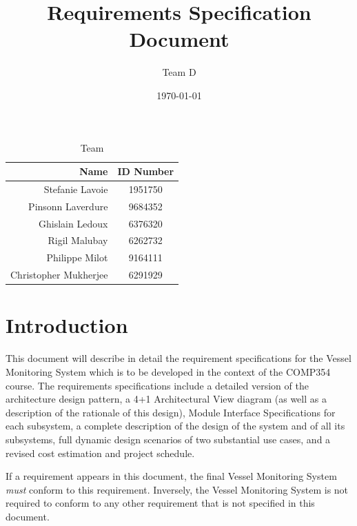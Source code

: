 \documentclass{article}
\begin{document}
\title{Requirements Specification Document}
\author{Team D}
\date{\today}

\maketitle

\vspace*{3.5in}
\begin{table}[htbp]
\caption{Team}
\begin{center}
\begin{tabular}{|r | c|}
\hline
Name & ID Number \\
\hline\hline
Stefanie Lavoie & 1951750 \\
Pinsonn Laverdure & 9684352 \\
Ghislain Ledoux & 6376320 \\
Rigil Malubay & 6262732 \\
Philippe Milot & 9164111 \\
Christopher Mukherjee & 6291929 \\
\hline
\end{tabular}
\end{center}
\end{table}

\clearpage

\tableofcontents
\clearpage


\section{Introduction} %

This document will describe in detail the requirement specifications for the Vessel Monitoring System which is to be developed in the context of the COMP354 course. The requirements specifications include a detailed version of the architecture design pattern, a 4+1 Architectural View diagram (as well as a description of the rationale of this design), Module Interface Specifications for each subsystem, a complete description of the design of the system and of all its subsystems, full dynamic design scenarios of two substantial use cases, and a revised cost estimation and project schedule.

If a requirement appears in this document, the final Vessel Monitoring System \emph{must} conform to this requirement. Inversely, the Vessel Monitoring System is not required to conform to any other requirement that is not specified in this document.
\end{document}
